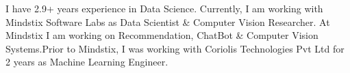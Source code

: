 
\begin{cvparagraph}
I have 2.9+ years experience in Data Science. Currently, I am working with Mindstix Software Labs as Data Scientist \& Computer Vision Researcher. At Mindstix I am working on Recommendation, ChatBot \& Computer Vision Systems.\newline Prior to Mindstix, I was working with Coriolis Technologies Pvt Ltd for 2 years as Machine Learning Engineer.
\end{cvparagraph}
